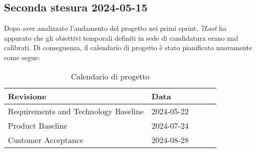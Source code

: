 \subsection{Seconda stesura 2024-05-15}
Dopo aver analizzato l'andamento del progetto nei primi sprint, \textit{7Last} ha appurato che gli obiettivi temporali definiti in sede di candidatura erano mal calibrati. Di conseguenza, il calendario di progetto è stato pianificato nuovamente come segue:
\begin{table}[!h]
    \begin{center}
        \begin{tabular}{ | l | l | l | l | l | }
            \hline
            Revisione                               & Data       \\ \hline
            Requirements and Technology Baseline    & 2024-05-22 \\
            Product Baseline                        & 2024-07-24 \\
            Customer Acceptance                     & 2024-08-28 \\
            \hline
        \end{tabular}
    \end{center}
    \caption{Calendario di progetto}
    \label{tab:11}
\end{table}